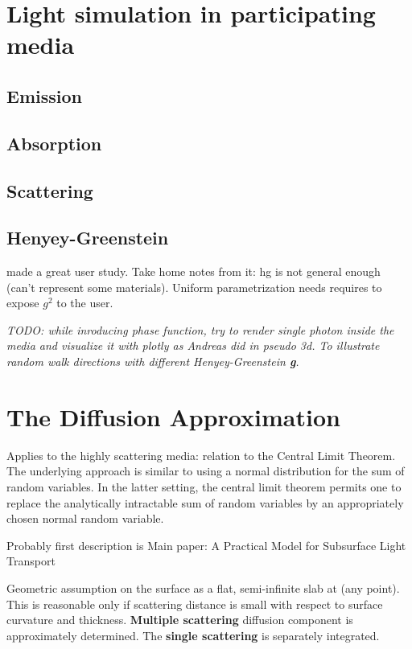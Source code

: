 \section{Light simulation in participating media}
\label{section:light_simulation_theory}
\subsection{Emission}
\subsection{Absorption}
\subsection{Scattering}

\subsection{Henyey-Greenstein}
\label{section:phasefunction}
\cite{Gkioulekas:2013:IVR:2508363.2508377} made a great user study.
Take home notes from it: \gls{hg} is not general enough (can't represent some
materials). Uniform parametrization needs requires to expose $g^2$ to the user.

\emph{TODO: while inroducing phase function, try to render single photon inside
the media and visualize it with plotly as Andreas did in pseudo 3d. To illustrate
random walk directions with different Henyey-Greenstein \textbf{g}.}

\section{The Diffusion Approximation}
Applies to the highly scattering media: relation to the Central Limit Theorem.
The underlying approach is similar to using a normal distribution for the sum of
random variables.
In the latter setting, the central limit theorem permits one to replace the analytically intractable sum of random variables by
an appropriately chosen normal random variable.

Probably first description is \cite{Stam1995}
Main paper: A Practical Model for Subsurface Light Transport \cite{Jensen:2001:PMS:383259.383319}

Geometric assumption on the surface as a flat, semi-infinite slab at (any
point). This is reasonable only if scattering distance is small with respect to
surface curvature and thickness. \textbf{Multiple scattering} diffusion
component is approximately determined. The \textbf{single scattering} is
separately integrated.

